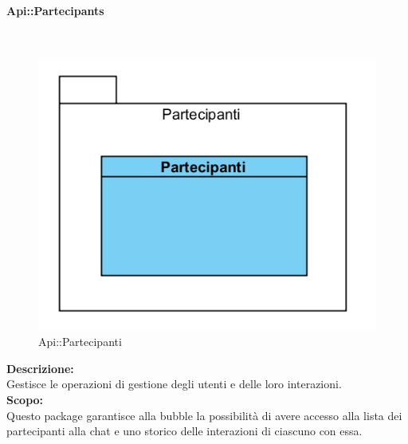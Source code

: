 \begin{samepage}
\paragraph{Api\-::Partecipants}\label{api-partecipanti}\mbox{}\\
\begin{figure}[H]
	\centering
	\includegraphics[width=14cm]{diagrammi_img/classi_e_package/api_partecipanti.png}
	\caption{Api\-::Partecipanti}
\end{figure}
\end{samepage}
\textbf{Descrizione:}\\ 
Gestisce le operazioni di gestione degli utenti e delle loro interazioni.\\
\textbf{Scopo:}\\
Questo package garantisce alla bubble la possibilità di avere accesso alla lista dei partecipanti alla chat e uno storico delle interazioni di ciascuno con essa.

